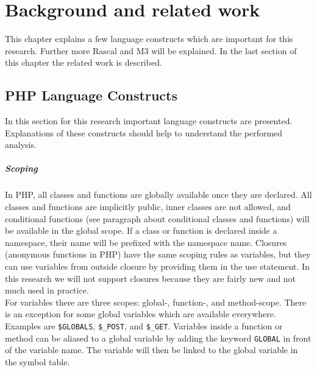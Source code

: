 \documentclass[../main.tex]{subfiles}
\begin{document}
    \chapter{Background and related work}\label{chap:background}
    This chapter explains a few language constructs which are important for this research.
    Further more Rascal and M3 will be explained.
    In the last section of this chapter the related work is described.
    
    \section{PHP Language Constructs}\label{sec:PHP_Language_Constructs}
    In this section for this research important language constructs are presented.
    Explanations of these constructs should help to understand the performed analysis.
    
    \paragraph{Scoping}
    In PHP, all classes and functions are globally available once they are declared.
    All classes and functions are implicitly public, inner classes are not allowed, and conditional functions (see paragraph about conditional classes and functions) will be available in the global scope.
    If a class or function is declared inside a namespace, their name will be prefixed with the namespace name.
    Closures (anonymous functions in PHP) have the same scoping rules as variables, but they can use variables from outside closure by providing them in the use statement. In this research we will not support closures because they are fairly new and not much used in practice. 
    \\
    For variables there are three scopes: global-, function-, and method-scope. 
    There is an exception for some global variables which are available everywhere. 
    Examples are \texttt{\$GLOBALS}, \texttt{\$\_POST}, and \texttt{\$\_GET}. 
    Variables inside a function or method can be aliased to a global variable by adding the keyword \texttt{GLOBAL} in front of the variable name.
    The variable will then be linked to the global variable in the symbol table\footnotemark.
    
\end{document}
